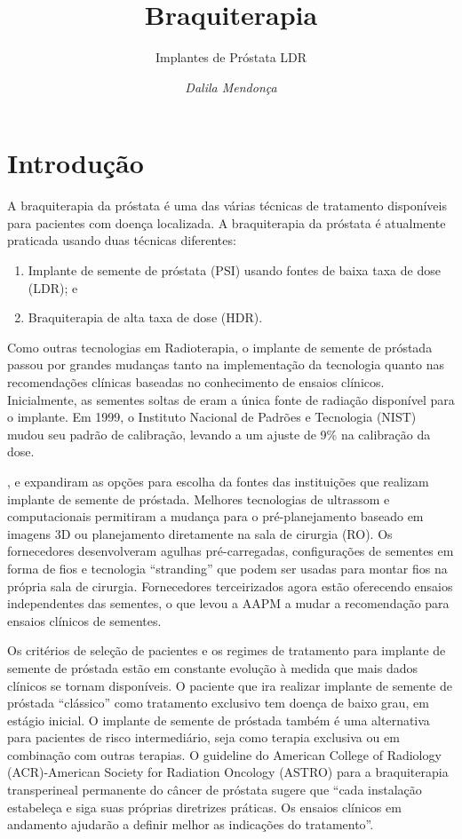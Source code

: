\documentclass[11pt,a4paper]{article}
\title{\LobsterTwo\Huge{Braquiterapia}}
\author{\LobsterTwo\Large{Implantes de Próstata LDR}\nocite{*}}
\date{\LobsterTwo\textit{Dalila Mendonça}}
\begin{document}
	\maketitle

\section{Introdução}

	A braquiterapia da próstata é uma das várias técnicas de tratamento disponíveis para pacientes com doença localizada. A braquiterapia da próstata é atualmente praticada usando duas técnicas diferentes:

	\begin{enumerate}[label=\textcolor{CarnationPink}{\roman*.}]
		\item Implante de semente de próstata (PSI) usando fontes de baixa taxa de dose (LDR); e
		\item Braquiterapia de alta taxa de dose (HDR).
	\end{enumerate}

	Como outras tecnologias em Radioterapia, o implante de semente de próstada passou por grandes mudanças tanto na implementação da tecnologia quanto nas recomendações clínicas baseadas no conhecimento de ensaios clínicos. Inicialmente, as sementes soltas de  eram a única fonte de radiação disponível para o implante. Em 1999, o Instituto Nacional de Padrões e Tecnologia (NIST) mudou seu padrão de calibração, levando a um ajuste de 9\% na calibração da dose. 
	
	,  e  expandiram as opções para escolha da fontes das instituições que realizam implante de semente de próstada. Melhores tecnologias de ultrassom e computacionais permitiram a mudança para o pré-planejamento baseado em imagens 3D ou planejamento diretamente na sala de cirurgia (RO). Os fornecedores desenvolveram agulhas pré-carregadas, configurações de sementes em forma de fios e tecnologia  ``stranding'' que podem ser usadas para montar fios na própria sala de cirurgia. Fornecedores terceirizados agora estão oferecendo ensaios independentes das sementes, o que levou a AAPM a mudar a recomendação para ensaios clínicos de sementes.

	Os critérios de seleção de pacientes e os regimes de tratamento para implante de semente de próstada estão em constante evolução à medida que mais dados clínicos se tornam disponíveis. O paciente que ira realizar implante de semente de próstada ``clássico'' como tratamento exclusivo tem doença de baixo grau, em estágio inicial. O implante de semente de próstada também é uma alternativa para pacientes de risco intermediário, seja como terapia exclusiva ou em combinação com outras terapias. O guideline do American College of Radiology (ACR)-American Society for Radiation Oncology (ASTRO) para a braquiterapia transperineal permanente do câncer de próstata sugere que ``cada instalação estabeleça e siga suas próprias diretrizes práticas. Os ensaios clínicos em andamento ajudarão a definir melhor as indicações do tratamento''. 
\end{document}
